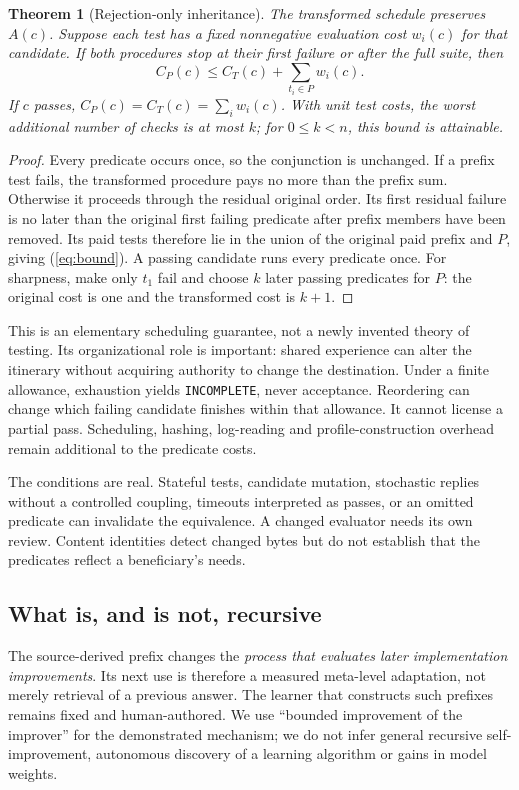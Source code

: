 \documentclass[11pt,letterpaper]{article}
\newtheorem{theorem}[proposition]{Theorem}
\begin{document}
\begin{theorem}[Rejection-only inheritance]
The transformed schedule preserves $A(c)$. Suppose each test has a fixed nonnegative evaluation cost $w_i(c)$ for that candidate. If both procedures stop at their first failure or after the full suite, then
\begin{equation}
 C_P(c)\le C_T(c)+\sum_{t_i\in P}w_i(c).
 \label{eq:bound}
\end{equation}
If $c$ passes, $C_P(c)=C_T(c)=\sum_iw_i(c)$. With unit test costs, the worst additional number of checks is at most $k$; for $0\le k<n$, this bound is attainable.
\end{theorem}
\begin{proof}
Every predicate occurs once, so the conjunction is unchanged. If a prefix test fails, the transformed procedure pays no more than the prefix sum. Otherwise it proceeds through the residual original order. Its first residual failure is no later than the original first failing predicate after prefix members have been removed. Its paid tests therefore lie in the union of the original paid prefix and $P$, giving (\ref{eq:bound}). A passing candidate runs every predicate once. For sharpness, make only $t_1$ fail and choose $k$ later passing predicates for $P$: the original cost is one and the transformed cost is $k+1$.
\end{proof}

This is an elementary scheduling guarantee, not a newly invented theory of testing. Its organizational role is important: shared experience can alter the itinerary without acquiring authority to change the destination. Under a finite allowance, exhaustion yields \texttt{INCOMPLETE}, never acceptance. Reordering can change which failing candidate finishes within that allowance. It cannot license a partial pass. Scheduling, hashing, log-reading and profile-construction overhead remain additional to the predicate costs.

The conditions are real. Stateful tests, candidate mutation, stochastic replies without a controlled coupling, timeouts interpreted as passes, or an omitted predicate can invalidate the equivalence. A changed evaluator needs its own review. Content identities detect changed bytes but do not establish that the predicates reflect a beneficiary's needs.

\subsection{What is, and is not, recursive}
The source-derived prefix changes the \emph{process that evaluates later implementation improvements}. Its next use is therefore a measured meta-level adaptation, not merely retrieval of a previous answer. The learner that constructs such prefixes remains fixed and human-authored. We use ``bounded improvement of the improver'' for the demonstrated mechanism; we do not infer general recursive self-improvement, autonomous discovery of a learning algorithm or gains in model weights.
\end{document}
